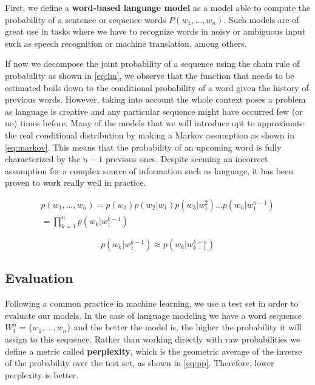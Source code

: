 First, we define a \textbf{word-based language model} as a model able to compute the probability of a sentence or sequence words $P(w_1, \ldots ,w_n)$. Such models are of great use in tasks where we have to recognize words in noisy or ambiguous input such as speech recognition or machine translation, among others.

If now we decompose the joint probability of a sequence using the chain rule of probability as shown in \autoref{eq:lm}, we observe that the function that needs to be estimated boils down to the conditional probability of a word given the history of previous words. However, taking into account the whole context poses a problem as language is creative and any particular sequence might have occurred few (or no) times before.  Many of the models that we will introduce opt to approximate the real conditional distribution by making a Markov assumption as shown in \autoref{eq:markov}. This means that the probability of an upcoming word is fully characterized by the $n-1$ previous ones. Despite seeming an incorrect assumption for a complex source of information such as language, it has been proven to work really well in practice.

\begin{equation} \label{eq:lm}
	\begin{gathered}
		p(w_1, \ldots ,w_n)=p(w_1)p(w_2|w_1)p(w_3|w_{1}^{2}) \ldots p(w_n|w_{1}^{n-1}) \\
		= \prod_{k=1}^{n} p(w_k|w_{1}^{k-1})
	\end{gathered}
\end{equation}

\begin{equation} \label{eq:markov}
	p(w_k|w_{1}^{k-1}) \approx p(w_k|w_{k-1}^{k-n})
\end{equation}

\subsection{Evaluation}

Following a common practice in machine learning, we use a test set in order to evaluate our models. In the case of language modeling we have a word sequence $W_1^n=\{w_1, \ldots , w_n\}$ and the better the model is, the higher the probability it will assign to this sequence. Rather than working directly with raw probabilities we define a metric called \textbf{perplexity}, which is the geometric average of the inverse of the probability over the test set, as shown in \autoref{eq:pp}. Therefore, lower perplexity is better.

